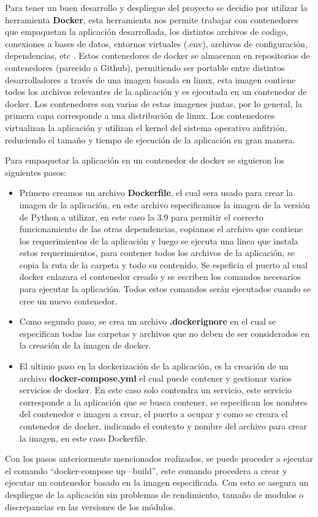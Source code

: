 Para tener un buen desarrollo y despliegue del proyecto se decidio por utilizar la herramienta \textbf{Docker}, esta herramienta nos permite trabajar con contenedores que empaquetan la aplicación desarrollada, los distintos archivos de codigo, conexiones a bases de datos, entornos virtuales (.env), archivos de configuración, dependencias, etc \cite{docker-docs}. Estos contenedores de docker se almacenan en repositorios de contenedores (parecido a Github), permitiendo ser portable entre distintos desarrolladores a través de una imagen basada en linux, esta imagen contiene todos los archivos relevantes de la aplicación y es ejecutada en un contenedor de docker. Los contenedores son varias de estas imagenes juntas, por lo general, la primera capa corresponde a una distribución de linux. Los contenedores virtualizan la aplicación y utilizan el kernel del sistema operativo anfitrión, reduciendo el tamaño y tiempo de ejecución de la aplicación en gran manera.

Para empaquetar la aplicación en un contenedor de docker se siguieron los siguientes pasos:

\begin{itemize}
    \item Primero creamos un archivo \textbf{Dockerfile}, el cual sera usado para crear la imagen de la aplicación, en este archivo especificamos la imagen de la versión de Python a utilizar, en este caso la 3.9 para permitir el correcto funcionamiento de las otras dependencias, copiamos el archivo que contiene los requerimientos de la aplicación y luego se ejecuta una linea que instala estos requerimientos, para contener todos los archivos de la aplicación, se copia la ruta de la carpeta y todo su contenido. Se espeficia el puerto al cual docker enlazara el contenedor creado y se escriben los comandos necesarios para ejecutar la aplicación. Todos estos comandos serán ejecutados cuando se cree un nuevo contenedor.

    \item Como segundo paso, se crea un archivo \textbf{.dockerignore} en el cual se especifican todas las carpetas y archivos que no deben de ser considerados en la creación de la imagen de docker.

    \item El ultimo paso en la dockerización de la aplicación, es la creación de un archivo \textbf{docker-compose.yml} el cual puede contener y gestionar varios servicios de docker. En este caso solo contendra un servicio, este servicio corresponde a la aplicación que se busca contener, se especifican los nombres del contenedor e imagen a crear, el puerto a ocupar y como se creara el contenedor de docker, indicando el contexto y nombre del archivo para crear la imagen, en este caso Dockerfile.

\end{itemize}

Con los pasos anteriormente mencionados realizados, se puede proceder a ejecutar el comando \textquotedblleft docker-compose up --build\textquotedblright , este comando procedera a crear y ejecutar un contenedor basado en la imagen especificada. Con esto se asegura un despliegue de la aplicación sin problemas de rendimiento, tamaño de modulos o discrepancias en las versiones de los módulos.